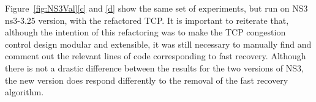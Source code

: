 \documentclass[11pt]{ucthesis}
\begin{document}
Figure~\ref{fig:NS3Val}\ref{c} and \ref{d} show the same set of experiments, but run on NS3 ns3-3.25 version, with the refactored TCP. It is important to reiterate that, although the intention of this refactoring was to make the TCP congestion control design modular and extensible, it was still necessary to manually find and comment out the relevant lines of code corresponding to fast recovery. Although there is not a drastic difference between the results for the two versions of NS3, the new version does respond differently to the removal of the fast recovery algorithm. %

\end{document}
